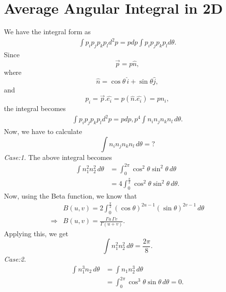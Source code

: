 \documentclass[%
 reprint,
 amsmath,amssymb,
 aps,
]{revtex4-2}
\begin{document}
    \section{Average Angular Integral in 2D}
    \label{App_D}
    We have the integral form as
    \begin{align}
    \int p_i p_j p_k p_l d^2p = p dp \int  p_i p_j p_k p_l d\theta.
    \end{align}
    Since
    $$\Vec{p} = p \hat{n},$$
    where $$ \hat{n} = \cos{\theta}\,\hat{i} + \sin{\theta}  \hat{j}, $$
    and
    $$ p_i = \Vec{p}.\hat{e_i} = p \left(\hat{n}.\hat{e_i}\right) = pn_i, $$
    the integral becomes
    \begin{align}
     \int p_i p_j p_k p_l d^2p = p dp, p^4 \int  n_i n_j n_k n_l \,d\theta.
    \end{align}
    Now, we have to calculate
    $$ \int  n_i n_j n_k n_l \,d\theta = ? $$
    {\it Case:1.} %
    The above integral becomes
    \begin{align}
        \int n_1^2 n_2^2\, d\theta &= \int_0^{2 \pi} \cos^2{\theta} \sin^2{\theta} \, d\theta\\
        & = 4  \int_0^{ \frac{\pi}{2}} \cos^2{\theta} \sin^2{\theta} \, d\theta.
    \end{align}
    Now, using the Beta function, we know that
    \begin{align}
        & B\left( u, v\right) = 2 \int_0^{\frac{\pi}{2}} \left(\cos{\theta}\right)^{2u-1}\left( \sin{\theta}\right)^{2v-1} \, d\theta\\
        \Rightarrow & B\left( u, v\right) = \frac{\Gamma u\, \Gamma v}{\Gamma\left(u+v\right)}.
    \end{align}
    Applying this, we get
    \begin{equation}
        \int n_1^2 n_2^2\, d\theta = \frac{2 \pi}{8}.
    \end{equation}
    {\it Case:2.}%
    \begin{align}
        \int n_1^3 n_2\, d\theta &= \int n_1 n_2^3\, d\theta\\
        & = \int_0^{2 \pi} \cos^3{\theta} \sin{\theta} \, d\theta = 0.
    \end{align}
\end{document}
